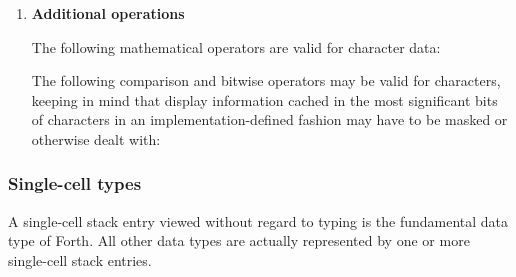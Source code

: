 \begin{enumerate}
	In addition to  and , characters are moved to,
	from and upon the data stack by the following words:
	\begin{quote}\ttfamily
					
					
				
	\end{quote}

\item \textbf{Additional operations}

	The following mathematical operators are valid for character data:

	\begin{quote}\ttfamily
		\word{+}	\word{-}	\word{*}	\word{/}
			
	\end{quote}

	The following comparison and bitwise operators may be valid for
	characters, keeping in mind that display information cached in
	the most significant bits of characters in an implementation-defined
	fashion may have to be masked or otherwise dealt with:

	\begin{quote}\ttfamily
							
				\word{=}	
							
			
	\end{quote}
\end{enumerate}

\pagebreak
\subsubsection{Single-cell types} %

A single-cell stack entry viewed without regard to typing is the
fundamental data type of Forth. All other data types are actually
represented by one or more single-cell stack entries.

